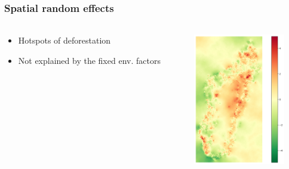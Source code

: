 \documentclass[slidetop,10pt,dvipsnames,leqno,fleqn]{beamer} %
\begin{document}
\begin{frame}
  \frametitle{Spatial random effects}
  \framesubtitle{}
  \begin{columns}
    \begin{column}{0.5\textwidth}
      \begin{block}{}
        \begin{itemize}
        \item Hotspots of deforestation
        \item Not explained by the fixed env. factors 
        \end{itemize}
      \end{block}
    \end{column}
    \begin{column}{0.5\textwidth}
      \centering \includegraphics[width=4cm]{./Figures/rho_orig.png}
    \end{column}
  \end{columns}
\end{frame}
\end{document}
